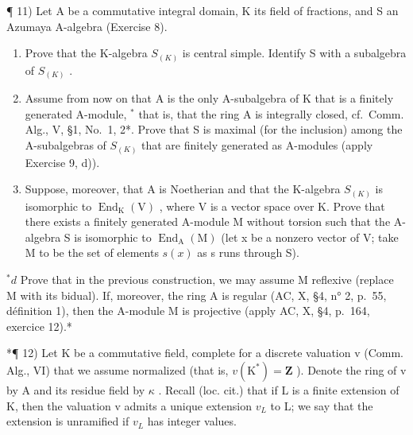 ¶ 11) Let A be a commutative integral domain, K its field of fractions, and S an Azumaya A-algebra (Exercise 8).

\begin{enumerate}
\def\labelenumi{\alph{enumi})}
\item
  Prove that the K-algebra \(S_{(K)}\) is central simple. Identify S with a subalgebra of \(S_{(K)}\) .
\item
  Assume from now on that A is the only A-subalgebra of K that is a finitely generated A-module, \(^{*}\) that is, that the ring A is integrally closed, cf.~Comm. Alg., V, §1, No.~1, 2*. Prove that S is maximal (for the inclusion) among the A-subalgebras of \(S_{(K)}\) that are finitely generated as A-modules (apply Exercise 9, d)).
\item
  Suppose, moreover, that A is Noetherian and that the K-algebra \(S_{(K)}\) is isomorphic to \(\operatorname{End}_{\mathrm{K}}(\mathrm{V})\) , where V is a vector space over K. Prove that there exists a finitely generated A-module M without torsion such that the A-algebra S is isomorphic to \(\operatorname{End}_{\mathrm{A}}(\mathrm{M})\) (let x be a nonzero vector of V; take M to be the set of elements \(s(x)\) as s runs through S).
\end{enumerate}

\(^{*}d\) Prove that in the previous construction, we may assume M reflexive (replace M with its bidual). If, moreover, the ring A is regular (AC, X, §4, n° 2, p.~55, définition 1), then the A-module M is projective (apply AC, X, §4, p.~164, exercice 12).*

*¶ 12) Let K be a commutative field, complete for a discrete valuation v (Comm. Alg., VI) that we assume normalized (that is, \(v(\mathrm{K}^{*}) = \mathbf{Z}\) ). Denote the ring of v by A and its residue field by \(\kappa\) . Recall (loc. cit.) that if L is a finite extension of K, then the valuation v admits a unique extension \(v_{L}\) to L; we say that the extension is unramified if \(v_{L}\) has integer values.

